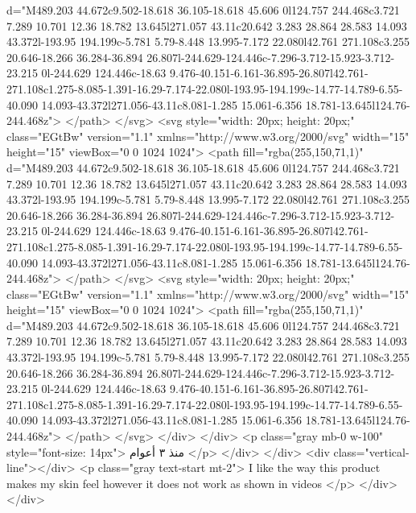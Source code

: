                         d="M489.203 44.672c9.502-18.618 36.105-18.618 45.606 0l124.757 244.468c3.721 7.289 10.701 12.36 18.782 13.645l271.057 43.11c20.642 3.283 28.864 28.583 14.093 43.372l-193.95 194.199c-5.781 5.79-8.448 13.995-7.172 22.080l42.761 271.108c3.255 20.646-18.266 36.284-36.894 26.807l-244.629-124.446c-7.296-3.712-15.923-3.712-23.215 0l-244.629 124.446c-18.63 9.476-40.151-6.161-36.895-26.807l42.761-271.108c1.275-8.085-1.391-16.29-7.174-22.080l-193.95-194.199c-14.77-14.789-6.55-40.090 14.093-43.372l271.056-43.11c8.081-1.285 15.061-6.356 18.781-13.645l124.76-244.468z">
                      </path>
                    </svg>
                    <svg style="width: 20px; height: 20px;" class="EGtBw" version="1.1"
                      xmlns="http://www.w3.org/2000/svg" width="15" height="15" viewBox="0 0 1024 1024">
                      <path fill="rgba(255,150,71,1)"
                        d="M489.203 44.672c9.502-18.618 36.105-18.618 45.606 0l124.757 244.468c3.721 7.289 10.701 12.36 18.782 13.645l271.057 43.11c20.642 3.283 28.864 28.583 14.093 43.372l-193.95 194.199c-5.781 5.79-8.448 13.995-7.172 22.080l42.761 271.108c3.255 20.646-18.266 36.284-36.894 26.807l-244.629-124.446c-7.296-3.712-15.923-3.712-23.215 0l-244.629 124.446c-18.63 9.476-40.151-6.161-36.895-26.807l42.761-271.108c1.275-8.085-1.391-16.29-7.174-22.080l-193.95-194.199c-14.77-14.789-6.55-40.090 14.093-43.372l271.056-43.11c8.081-1.285 15.061-6.356 18.781-13.645l124.76-244.468z">
                      </path>
                    </svg>
                    <svg style="width: 20px; height: 20px;" class="EGtBw" version="1.1"
                      xmlns="http://www.w3.org/2000/svg" width="15" height="15" viewBox="0 0 1024 1024">
                      <path fill="rgba(255,150,71,1)"
                        d="M489.203 44.672c9.502-18.618 36.105-18.618 45.606 0l124.757 244.468c3.721 7.289 10.701 12.36 18.782 13.645l271.057 43.11c20.642 3.283 28.864 28.583 14.093 43.372l-193.95 194.199c-5.781 5.79-8.448 13.995-7.172 22.080l42.761 271.108c3.255 20.646-18.266 36.284-36.894 26.807l-244.629-124.446c-7.296-3.712-15.923-3.712-23.215 0l-244.629 124.446c-18.63 9.476-40.151-6.161-36.895-26.807l42.761-271.108c1.275-8.085-1.391-16.29-7.174-22.080l-193.95-194.199c-14.77-14.789-6.55-40.090 14.093-43.372l271.056-43.11c8.081-1.285 15.061-6.356 18.781-13.645l124.76-244.468z">
                      </path>
                    </svg>
                  </div>
                </div>
                <p class="gray mb-0 w-100" style="font-size: 14px">
                  منذ ٣ أعوام
                </p>
              </div>
            </div>
            <div class="vertical-line"></div>
            <p class="gray text-start mt-2">
              I like the way this product makes my skin feel however it does not
              work as shown in videos
            </p>
          </div>
        </div>

